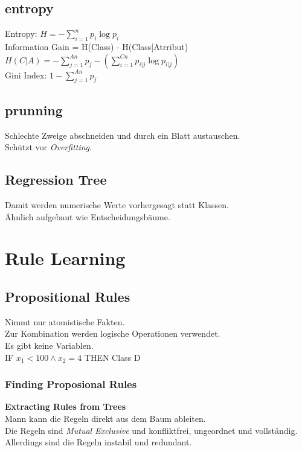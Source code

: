 \documentclass[a4paper]{scrartcl}
\begin{document}
\subsection{entropy}
Entropy: $H = -\sum\limits^n _{i=1} p_i \log p_i $\\
Information Gain = H(Class) - H(Class|Atrribut)\\
$H(C|A) = -\sum\limits^{An} _{j=1} p_j-(\sum\limits^{Cn} _{i=1} p_{i|j} \log p_{i|j})$\\
Gini Index: $1-\sum\limits^{An} _{j=1} p_j$

\subsection{prunning}
Schlechte Zweige abschneiden und durch ein Blatt austauschen.\\
Schützt vor \textit{Overfitting}.

\subsection{Regression Tree}
Damit werden numerische Werte vorhergesagt statt Klassen.\\
Ähnlich aufgebaut wie Entscheidungsbäume.

\section{Rule Learning}
\subsection{Propositional Rules}
Nimmt nur atomistische Fakten.\\
Zur Kombination werden logische Operationen verwendet.\\
Es gibt keine Variablen.\\
IF $x_1 < 100 \wedge x_2 = 4$ THEN Class D

\subsubsection{Finding Proposional Rules}
\textbf{Extracting Rules from Trees}\\
Mann kann die Regeln direkt aus dem Baum ableiten.\\
Die Regeln sind \textit{Mutual Exclusive} und konfliktfrei, ungeordnet und vollständig.\\
Allerdings sind die Regeln instabil und redundant.\\
\end{document}
